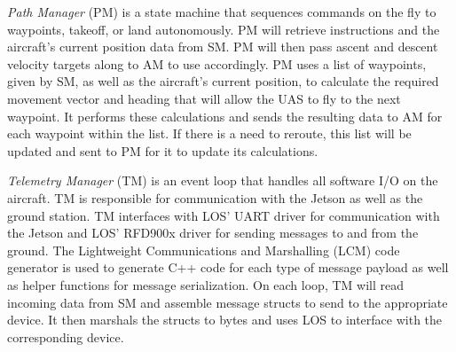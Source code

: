 \textit{Path Manager} (PM) is a state machine that sequences commands on the fly to
waypoints, takeoff, or land autonomously. PM will retrieve instructions and the
aircraft's current position data from SM. PM will then pass ascent and descent
velocity targets along to AM to use accordingly. PM uses a list of waypoints, given
by SM, as well as the aircraft's current position, to calculate the required movement
vector and heading that will allow the UAS to fly to the next waypoint. It performs
these calculations and sends the resulting data to AM for each waypoint within the
list. If there is a need to reroute, this list will be updated and sent to PM for
it to update its calculations.

\textit{Telemetry Manager} (TM) is an event loop that handles all software I/O on the
aircraft. TM is responsible for communication with the Jetson as well as the ground
station. TM interfaces with LOS' UART driver for communication with the Jetson and
LOS' RFD900x driver for sending messages to and from the ground. The Lightweight
Communications and Marshalling (LCM) code generator is used to generate C++ code
for each type of message payload as well as helper functions for message
serialization. On each loop, TM will read incoming data from SM and assemble message
structs to send to the appropriate device. It then marshals the structs to bytes and 
uses LOS to interface with the corresponding device.